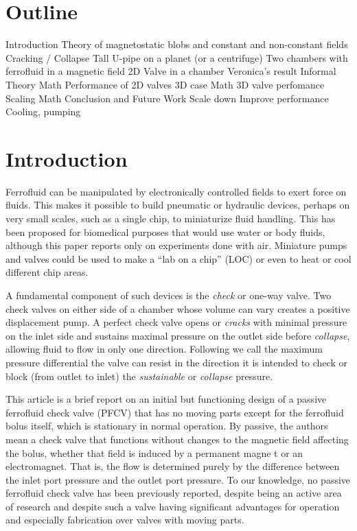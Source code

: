 \documentclass{asme2ej}
\begin{document}
\section{Outline}


\begin{outline}[enumerate]
  \1 Introduction
  \1 Theory of magnetostatic blobs and constant and non-constant fields
     \2 Cracking / Collapse
     \2 Tall U-pipe on a planet (or a centrifuge)
     \2 Two chambers with ferrofluid in a magnetic field
  \1 2D Valve in a chamber
      \2 Veronica's result
      \2 Informal Theory
      \2 Math
      \2 Performance of 2D valves
  \1 3D case
      \2 Math
      \2 3D valve perfomance
  \1 Scaling
       \2 Math
  \1 Conclusion and Future Work
       \2 Scale down
       \2 Improve performance
       \2 Cooling, pumping
\end{outline}



\section{Introduction}

Ferrofluid can be manipulated by electronically controlled
fields to exert force on fluids\cite{torres2014recent,kole2021engineering,ozbey2015modeling}.
This makes it possible to build pneumatic or hydraulic
devices, perhaps on very small scales,
such as a single chip\cite{yamahata2003ferrofluid,hatch2001ferrofluidic}, to
miniaturize fluid handling.
This has been proposed for biomedical purposes\cite{michelson2019novel}
that would use water or body fluids,
although this paper reports only on experiments done with air.
Miniature pumps and valves could be used to make a “lab on a chip” (LOC) or
even to heat or cool different chip areas.

A fundamental component of such
devices is the {\em check} or one-way valve.
Two check
valves on either side of a chamber whose volume can vary creates a
positive displacement pump.
A perfect check valve opens or
{\em cracks} with minimal pressure on the inlet side and sustains maximal
pressure on the outlet side before {\em collapse},
allowing fluid to flow in only one
direction. Following\cite{hartshorne2004ferrofluid} we call the maximum pressure
differential the valve can resist in the direction it is intended to
check or block (from outlet to inlet) the {\em sustainable} or {\em collapse} pressure.

This article is a brief report on an initial but functioning design of a
passive ferrofluid check valve (PFCV) that has no moving
parts except for the ferrofluid bolus itself, which is stationary
in normal operation.
By passive, the authors
mean a check valve that functions without changes to the magnetic
field affecting the bolus, whether that field is induced by a
permanent magne t or an electromagnet.
That is, the flow is determined
purely by the difference between the inlet port pressure and the
outlet port pressure.
To our knowledge, no passive
ferrofluid check valve has been previously reported, despite being an
active area of research and despite such a valve having
significant advantages for operation and especially
fabrication over valves with moving parts.
\end{document}
